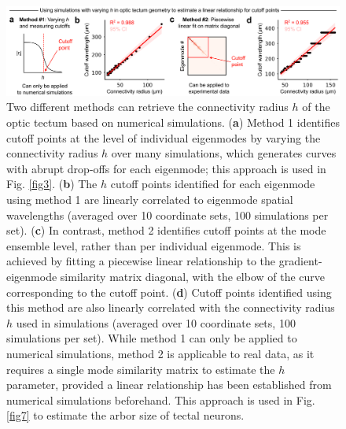 \documentclass{article}
\begin{document}
\begin{figure}[t]
    \centering
    \includegraphics[width=1.0\linewidth]{figures/supp_tectum_cutoff.png}
    \caption{Two different methods can retrieve the connectivity radius $h$ of the optic tectum based on numerical simulations. (\textbf{a}) Method 1 identifies cutoff points at the level of individual eigenmodes by varying the connectivity radius $h$ over many simulations, which generates curves with abrupt drop-offs for each eigenmode; this approach is used in Fig. \ref{fig3}. (\textbf{b}) The $h$ cutoff points identified for each eigenmode using method 1 are linearly correlated to eigenmode spatial wavelengths (averaged over 10 coordinate sets, 100 simulations per set). (\textbf{c}) In contrast, method 2 identifies cutoff points at the mode ensemble level, rather than per individual eigenmode. This is achieved by fitting a piecewise linear relationship to the gradient-eigenmode similarity matrix diagonal, with the elbow of the curve corresponding to the cutoff point. (\textbf{d}) Cutoff points identified using this method are also linearly correlated with the connectivity radius $h$ used in simulations (averaged over 10 coordinate sets, 100 simulations per set). While method 1 can only be applied to numerical simulations, method 2 is applicable to real data, as it requires a single mode similarity matrix to estimate the $h$ parameter, provided a linear relationship has been established from numerical simulations beforehand. This approach is used in Fig. \ref{fig7} to estimate the arbor size of tectal neurons.}
    \label{supp_tectum_cutoff}
\end{figure}

\newpage
\end{document}
